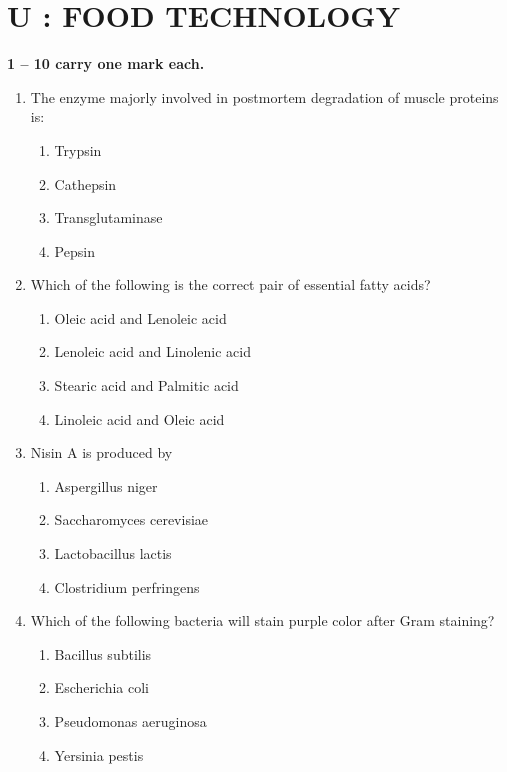 \documentclass[journal,12pt,onecolumn]{IEEEtran}
\begin{document}
\section*{\centering U : FOOD TECHNOLOGY}

\noindent \textbf{ 1 -- 10 carry one mark each.}

\begin{enumerate}[label=\arabic*.]

\item The enzyme majorly involved in postmortem degradation of muscle proteins is:
\begin{multicols}{2}
\begin{enumerate}[label=(\Alph*)]
\item Trypsin
\item Cathepsin
\item Transglutaminase
\item Pepsin
\end{enumerate}
\end{multicols}

\item Which of the following is the correct pair of essential fatty acids?
\begin{multicols}{2}
\begin{enumerate}[label=(\Alph*)]
\item Oleic acid and Lenoleic acid
\item Lenoleic acid and Linolenic acid
\item Stearic acid and Palmitic acid
\item Linoleic acid and Oleic acid
\end{enumerate}
\end{multicols}

\item Nisin A is produced by
\begin{multicols}{2}
\begin{enumerate}[label=(\Alph*)]
\item Aspergillus niger
\item Saccharomyces cerevisiae
\item Lactobacillus lactis
\item Clostridium perfringens
\end{enumerate}
\end{multicols}

\item Which of the following bacteria will stain purple color after Gram staining?
\begin{multicols}{2}
\begin{enumerate}[label=(\Alph*)]
\item Bacillus subtilis
\item Escherichia coli
\item Pseudomonas aeruginosa
\item Yersinia pestis
\end{enumerate}
\end{multicols}


\end{enumerate}
\end{document}
